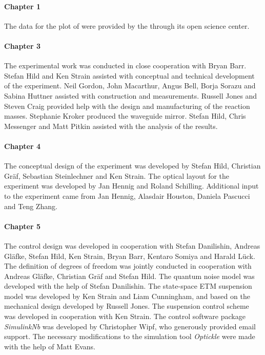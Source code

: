 \newpage

\paragraph{Chapter 1}
The data for the plot of \GWFIRSTEVENT{} were provided by the \LSC{} through its open science center.

\paragraph{Chapter 3}
The experimental work was conducted in close cooperation with Bryan Barr. Stefan Hild and Ken Strain assisted with conceptual and technical development of the experiment. Neil Gordon, John Macarthur, Angus Bell, Borja Sorazu and Sabina Huttner assisted with construction and measurements. Russell Jones and Steven Craig provided help with the design and manufacturing of the reaction masses. Stephanie Kroker produced the waveguide mirror. Stefan Hild, Chris Messenger and Matt Pitkin assisted with the analysis of the results.

\paragraph{Chapter 4}
The conceptual design of the experiment was developed by Stefan Hild, Christian Gr\"{a}f, Sebastian Steinlechner and Ken Strain. The optical layout for the experiment was developed by Jan Hennig and Roland Schilling. Additional input to the experiment came from Jan Hennig, Alasdair Houston, Daniela Pascucci and Teng Zhang.

\paragraph{Chapter 5}
The control design was developed in cooperation with Stefan Danilishin, Andreas Gl\"{a}fke, Stefan Hild, Ken Strain, Bryan Barr, Kentaro Somiya and Harald L\"{u}ck. The definition of degrees of freedom was jointly conducted in cooperation with Andreas Gl\"{a}fke, Christian Gr\"{a}f and Stefan Hild. The quantum noise model was developed with the help of Stefan Danilishin. The state-space ETM suspension model was developed by Ken Strain and Liam Cunningham, and based on the mechanical design developed by Russell Jones. The suspension control scheme was developed in cooperation with Ken Strain. The control software package \emph{SimulinkNb} was developed by Christopher Wipf, who generously provided email support. The necessary modifications to the simulation tool \emph{Optickle} were made with the help of Matt Evans.

